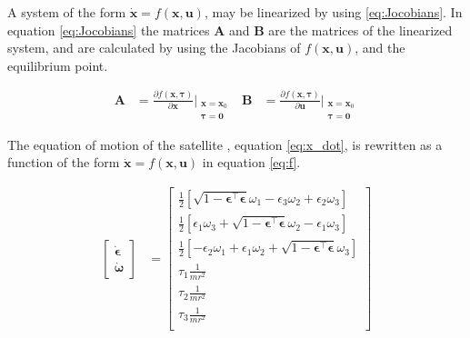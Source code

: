 A system of the form $\dot{\mathbf{x}} = f(\mathbf{x , u})$, may be linearized by using \eqref{eq:Jocobians}. In equation \eqref{eq:Jocobians} the matrices \textbf{A} and \textbf{B} are the matrices of the linearized system, and are calculated by using the Jacobians of $f(\mathbf{x},\mathbf{u}) $, and the equilibrium point.  

\begin{equation}
    \begin{aligned}
        \mathbf{A}&= \frac{\partial f(\mathbf{x,\boldsymbol{\tau}})}{\partial \mathbf{x}}\Bigr|_{\substack{\mathbf{x}= \mathbf{x}_0 \\ \boldsymbol{\tau=0 }}} &
        \mathbf{B}&= \frac{\partial f(\mathbf{x,\boldsymbol{\tau}})}{\partial \mathbf{u}}\Bigr|_{\substack{\mathbf{x}= \mathbf{x}_0 \\ \boldsymbol{\tau=0 }}} 
    \end{aligned}
    \label{eq:Jocobians}
\end{equation}

The equation of motion of the satellite , equation \eqref{eq:x_dot}, is rewritten as a function of the form $\dot{\mathbf{x}} = f(\mathbf{x , u})$ in equation \eqref{eq:f}.

\begin{equation}
    \begin{aligned}
    \begin{bmatrix}
		\dot{\boldsymbol{\epsilon}} \\
		\dot{\boldsymbol{\omega}}
    \end{bmatrix}
	&= 
	\begin{bmatrix}
		\frac{1}{2}[ \sqrt{1-\boldsymbol{\epsilon}^\top \boldsymbol{\epsilon}} \omega_1  - \epsilon_3 \omega_2 + \epsilon_2 \omega_3  ] \\
		\frac{1}{2}[ \epsilon_1 \omega_3 +  \sqrt{1-\boldsymbol{\epsilon}^\top \boldsymbol{\epsilon}} \omega_2  - \epsilon_1 \omega_3 ] \\
		\frac{1}{2}[  - \epsilon_2 \omega_1  + \epsilon_1 \omega_2 + \sqrt{1-\boldsymbol{\epsilon}^\top \boldsymbol{\epsilon}} \omega_3  ] \\
		\tau_1 \frac{1}{mr^2}\\
		\tau_2 \frac{1}{mr^2}\\
		\tau_3 \frac{1}{mr^2}\\
	\end{bmatrix}
	\label{eq:f}
	\end{aligned}
\end{equation}



